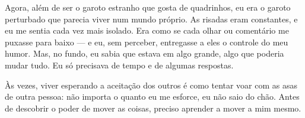 Agora, além de ser o garoto estranho que gosta de quadrinhos, eu era o garoto perturbado que parecia viver num mundo próprio. As risadas eram constantes, e eu me sentia cada vez mais isolado. Era como se cada olhar ou comentário me puxasse para baixo — e eu, sem perceber, entregasse a eles o controle do meu humor. Mas, no fundo, eu sabia que estava em algo grande, algo que poderia mudar tudo. Eu só precisava de tempo e de algumas respostas.

Às vezes, viver esperando a aceitação dos outros é como tentar voar com as asas de outra pessoa: não importa o quanto eu me esforce, eu não saio do chão. Antes de descobrir o poder de mover as coisas, preciso aprender a mover a mim mesmo.
